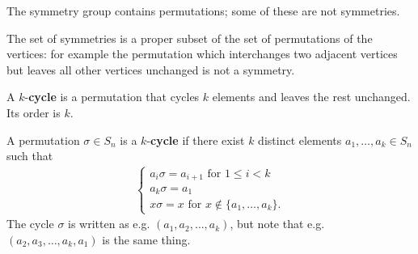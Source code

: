 \begin{remark*}
  The symmetry group contains permutations; some of these are not symmetries.

  The set of symmetries is a proper subset of the set of permutations of the vertices: for example
  the permutation which interchanges two adjacent vertices but leaves all other vertices unchanged
  is not a symmetry.
\end{remark*}

\begin{intuition*}
  A $k$-\textbf{cycle} is a permutation that cycles $k$ elements and leaves the rest unchanged. Its
  order is $k$.
\end{intuition*}

\begin{definition*}
  A permutation $\sigma \in S_n$ is a $k$-\textbf{cycle} if there exist $k$ distinct elements
  $a_1, \ldots, a_k \in S_n$ such that
  \begin{align*}
    \begin{cases}
      a_i\sigma = a_{i+1} \text{~for~} 1 \leq i < k\\
      a_k\sigma = a_1\\
      x\sigma = x \text{~for~} x \notin \{a_1, \ldots, a_k\}.
    \end{cases}
  \end{align*}
  The cycle $\sigma$ is written as e.g. $(a_1, a_2, \ldots, a_k)$, but note that e.g.
  $(a_2, a_3, \ldots, a_k, a_1)$ is the same thing.
\end{definition*}

